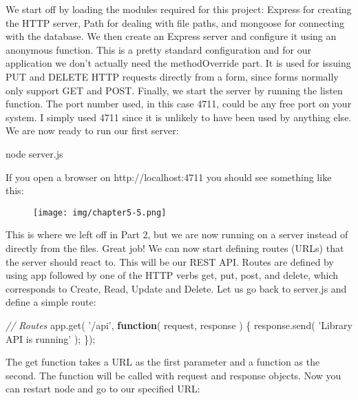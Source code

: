 \documentclass[9pt]{book}
\newenvironment{Shaded}{}{}
\newcommand{\KeywordTok}[1]{\textcolor[rgb]{0.00,0.44,0.13}{\textbf{{#1}}}}
\newcommand{\StringTok}[1]{\textcolor[rgb]{0.25,0.44,0.63}{{#1}}}
\newcommand{\CommentTok}[1]{\textcolor[rgb]{0.38,0.63,0.69}{\textit{{#1}}}}
\newcommand{\OtherTok}[1]{\textcolor[rgb]{0.00,0.44,0.13}{{#1}}}
\newcommand{\FunctionTok}[1]{\textcolor[rgb]{0.02,0.16,0.49}{{#1}}}
\newcommand{\NormalTok}[1]{{#1}}
\begin{document}
We start off by loading the modules required for this project: Express
for creating the HTTP server, Path for dealing with file paths, and
mongoose for connecting with the database. We then create an Express
server and configure it using an anonymous function. This is a pretty
standard configuration and for our application we don't actually need
the methodOverride part. It is used for issuing PUT and DELETE HTTP
requests directly from a form, since forms normally only support GET and
POST. Finally, we start the server by running the listen function. The
port number used, in this case 4711, could be any free port on your
system. I simply used 4711 since it is unlikely to have been used by
anything else. We are now ready to run our first server:

\begin{Shaded}
\begin{Highlighting}[]
\NormalTok{node }\OtherTok{server}\NormalTok{.}\FunctionTok{js}
\end{Highlighting}
\end{Shaded}

If you open a browser on http://localhost:4711 you should see something
like this:

\begin{figure}[htbp]
\centering
\texttt{[image: img/chapter5-5.png]}
\end{figure}

This is where we left off in Part 2, but we are now running on a server
instead of directly from the files. Great job! We can now start defining
routes (URLs) that the server should react to. This will be our REST
API. Routes are defined by using app followed by one of the HTTP verbs
get, put, post, and delete, which corresponds to Create, Read, Update
and Delete. Let us go back to server.js and define a simple route:

\begin{Shaded}
\begin{Highlighting}[]
\CommentTok{// Routes}
\OtherTok{app}\NormalTok{.}\FunctionTok{get}\NormalTok{( }\StringTok{'/api'}\NormalTok{, }\KeywordTok{function}\NormalTok{( request, response ) \{}
    \OtherTok{response}\NormalTok{.}\FunctionTok{send}\NormalTok{( }\StringTok{'Library API is running'} \NormalTok{);}
\NormalTok{\});}
\end{Highlighting}
\end{Shaded}

The get function takes a URL as the first parameter and a function as
the second. The function will be called with request and response
objects. Now you can restart node and go to our specified URL:
\end{document}
